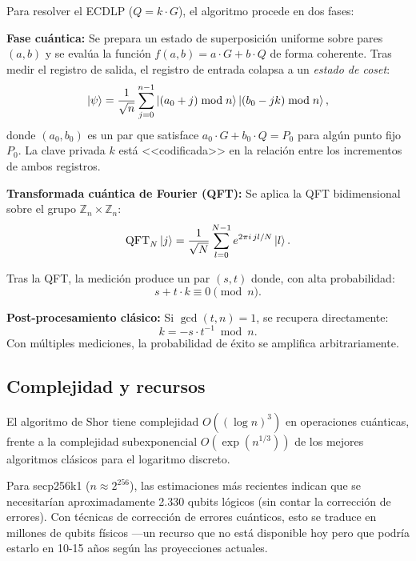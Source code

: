 Para resolver el ECDLP ($Q = k \cdot G$), el algoritmo procede en dos fases:

\textbf{Fase cuántica:} Se prepara un estado de superposición uniforme sobre pares $(a, b)$ y se evalúa la función $f(a, b) = a \cdot G + b \cdot Q$ de forma coherente. Tras medir el registro de salida, el registro de entrada colapsa a un \emph{estado de coset}:
\begin{equation}
  \ket{\psi} = \frac{1}{\sqrt{n}} \sum_{j=0}^{n-1} \ket{(a_0 + j) \bmod n} \ket{(b_0 - jk) \bmod n},
  \label{eq:coset_state}
\end{equation}
donde $(a_0, b_0)$ es un par que satisface $a_0 \cdot G + b_0 \cdot Q = P_0$ para algún punto fijo $P_0$. La clave privada $k$ está <<codificada>> en la relación entre los incrementos de ambos registros.

\textbf{Transformada cuántica de Fourier (QFT):} Se aplica la QFT bidimensional sobre el grupo $\mathbb{Z}_n \times \mathbb{Z}_n$:
\begin{equation}
  \text{QFT}_N \ket{j} = \frac{1}{\sqrt{N}} \sum_{l=0}^{N-1} e^{2\pi i \, jl / N} \ket{l}.
  \label{eq:qft}
\end{equation}

Tras la QFT, la medición produce un par $(s, t)$ donde, con alta probabilidad:
\begin{equation}
  s + t \cdot k \equiv 0 \pmod{n}.
  \label{eq:shor_relation}
\end{equation}

\textbf{Post-procesamiento clásico:} Si $\gcd(t, n) = 1$, se recupera directamente:
\begin{equation}
  k = -s \cdot t^{-1} \bmod n.
  \label{eq:key_recovery}
\end{equation}
Con múltiples mediciones, la probabilidad de éxito se amplifica arbitrariamente.

\subsection{Complejidad y recursos}

El algoritmo de Shor tiene complejidad $O((\log n)^3)$ en operaciones cuánticas, frente a la complejidad subexponencial $O(\exp(n^{1/3}))$ de los mejores algoritmos clásicos para el logaritmo discreto.

Para secp256k1 ($n \approx 2^{256}$), las estimaciones más recientes \parencite{choosingcoordinates2025} indican que se necesitarían aproximadamente 2.330 qubits lógicos (sin contar la corrección de errores). Con técnicas de corrección de errores cuánticos, esto se traduce en millones de qubits físicos ---un recurso que no está disponible hoy pero que podría estarlo en 10-15 años según las proyecciones actuales.

